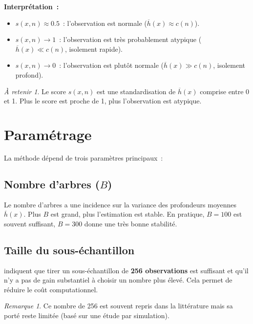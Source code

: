 \documentclass[a4paper,11pt]{article}
\theoremstyle{definition}
\theoremstyle{remark}
\newtheorem*{remark}{Remarque}
\newtheorem*{important}{\`A retenir}
\begin{document}
\textbf{Interpr\'etation~:}
\begin{itemize}
  \item $s(x, n) \approx 0.5$~: l'observation est normale
    ($\overline{h}(x) \approx c(n)$).
  \item $s(x, n) \to 1$~: l'observation est tr\`es probablement atypique
    ($\overline{h}(x) \ll c(n)$, isolement rapide).
  \item $s(x, n) \to 0$~: l'observation est plut\^ot normale
    ($\overline{h}(x) \gg c(n)$, isolement profond).
\end{itemize}

\begin{important}
  Le score $s(x,n)$ est une standardisation de $\overline{h}(x)$ comprise
  entre 0 et 1. Plus le score est proche de 1, plus l'observation est
  atypique.
\end{important}

\section{Param\'etrage}

La m\'ethode d\'epend de trois param\`etres principaux~:

\subsection{Nombre d'arbres ($B$)}

Le nombre d'arbres a une incidence sur la variance des profondeurs
moyennes $\overline{h}(x)$. Plus $B$ est grand, plus l'estimation est
stable. En pratique, $B = 100$ est souvent suffisant, $B = 300$ donne
une tr\`es bonne stabilit\'e.

\subsection{Taille du sous-\'echantillon}

\cite{LiuTZ08} indiquent que tirer un sous-\'echantillon de
\textbf{256 observations} est suffisant et qu'il n'y a pas de gain
substantiel \`a choisir un nombre plus \'elev\'e. Cela permet de r\'eduire
le co\^ut computationnel.

\begin{remark}
  Ce nombre de 256 est souvent repris dans la litt\'erature mais sa
  port\'e reste limit\'ee (bas\'e sur une \'etude par simulation).
\end{remark}
\end{document}
